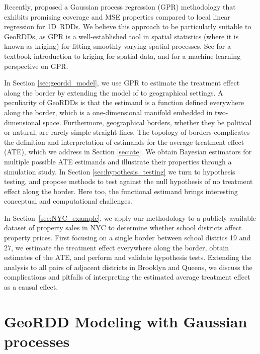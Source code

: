\documentclass[letter]{article}
\renewcommand{\cite}[1]{\citet{#1}}
\begin{document}
    	Recently, \cite{Branson:2017qy} proposed a Gaussian process regression (GPR) methodology that exhibits promising coverage and MSE properties compared to local linear regression for 1D~RDDs.
We believe this approach to be particularly suitable to GeoRDDs, as GPR is a well-established tool in spatial statistics (where it is known as kriging) for fitting smoothly varying spatial processes.
See \cite{banerjee2014hierarchical} for a textbook introduction to kriging for spatial data, and \cite{rasmussen2006gaussian} for a machine learning perspective on GPR.
    


    	In Section \ref{sec:geordd_model}, we use GPR to estimate the treatment effect along the border by extending the model of \cite{Branson:2017qy} to geographical settings.
A peculiarity of GeoRDDs is that the estimand is a function defined everywhere along the border, which is a one-dimensional manifold embedded in two-dimensional space.
Furthermore, geographical borders, whether they be political or natural, are rarely simple straight lines.
The topology of borders complicates the definition and interpretation of estimands for the average treatment effect (ATE), which we address in Section \ref{sec:ate}.
We obtain Bayesian estimators for multiple possible ATE estimands and illustrate their properties through a simulation study.
In Section \ref{sec:hypothesis_testing} we turn to hypothesis testing, and propose methods to test against the null hypothesis of no treatment effect along the border.
Here too, the functional estimand brings interesting conceptual and computational challenges.
    


    	In Section~\ref{sec:NYC_example}, we apply our methodology to a publicly available dataset of property sales in NYC to determine whether school districts affect property prices.
First focusing on a single border between school districs 19 and 27, we estimate the treatment effect everywhere along the border, obtain estimates of the ATE, and perform and validate hypothesis tests.
Extending the analysis to all pairs of adjacent districts in Brooklyn and Queens, we discuss the complications and pitfalls of interpreting the estimated average treatment effect as a causal effect.
    


    	\hypertarget{geordd-modeling-with-gaussian-processes}{%
\section{GeoRDD Modeling with Gaussian processes}\label{geordd-modeling-with-gaussian-processes}}
\end{document}
